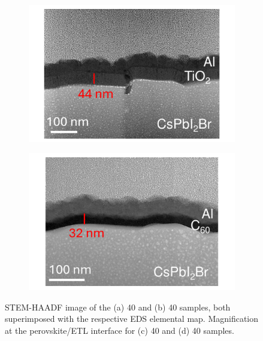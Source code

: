 \begin{figure}[ht!]
\begin{subfigure}[t]{0.45\textwidth}
        \caption{}
        \label{}
    \end{subfigure} 
    \begin{subfigure}[t]{0.45\textwidth}
        \centering
        \includegraphics[width=\textwidth]{chapters/transport_layers/images/SEM_TiO2.pdf} %
        \caption{}
        \label{}
    \end{subfigure}
    \hspace{0.5cm}
    \begin{subfigure}[t]{0.45\textwidth}
        \centering
        \includegraphics[width=\textwidth]{chapters/transport_layers/images/SEM_C60.pdf} %
        \caption{}
        \label{}
    \end{subfigure}
    \caption[STEM-HAADF and EDS elemental map of the 40 and 40 samples.]{STEM-HAADF image of the (a) 40 and (b) 40 samples, both superimposed with the respective EDS elemental map. Magnification at the perovskite/ETL interface for (c) 40 and (d) 40 samples.}
    \label{fig:etl_optimization:eds_tem_crossection}
\end{figure}


